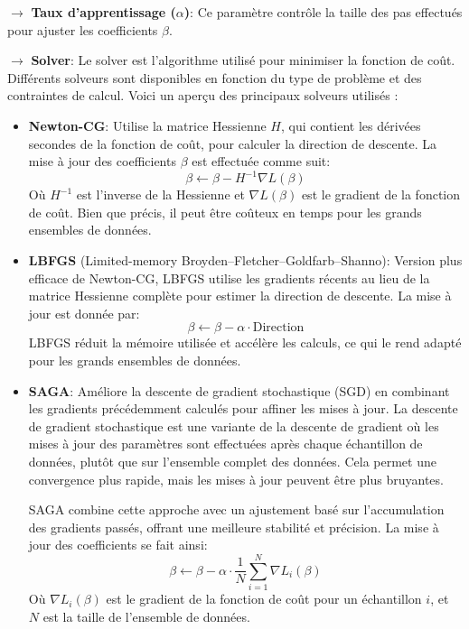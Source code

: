 \noindent \textbf{\(\rightarrow\)} \textbf{Taux d'apprentissage (\( \alpha \))}: Ce paramètre contrôle la taille des pas effectués pour ajuster les coefficients \( \beta \).

\noindent \textbf{\(\rightarrow\)} \textbf{Solver}: Le solver est l'algorithme utilisé pour minimiser la fonction de coût. Différents solveurs sont disponibles en fonction du type de problème et des contraintes de calcul. Voici un aperçu des principaux solveurs utilisés :

\begin{itemize}
    \item \textbf{Newton-CG}: Utilise la matrice Hessienne \( H \), qui contient les dérivées secondes de la fonction de coût, pour calculer la direction de descente. La mise à jour des coefficients \( \beta \) est effectuée comme suit:
    \[
    \beta \leftarrow \beta - H^{-1} \nabla L(\beta)
    \]
    Où \( H^{-1} \) est l'inverse de la Hessienne et \( \nabla L(\beta) \) est le gradient de la fonction de coût. Bien que précis, il peut être coûteux en temps pour les grands ensembles de données.

    \item \textbf{LBFGS} (Limited-memory Broyden–Fletcher–Goldfarb–Shanno): Version plus efficace de Newton-CG, LBFGS utilise les gradients récents au lieu de la matrice Hessienne complète pour estimer la direction de descente. La mise à jour est donnée par:
    \[
    \beta \leftarrow \beta - \alpha \cdot \text{Direction}
    \]
    LBFGS réduit la mémoire utilisée et accélère les calculs, ce qui le rend adapté pour les grands ensembles de données.

    \item \textbf{SAGA}: Améliore la descente de gradient stochastique (SGD) en combinant les gradients précédemment calculés pour affiner les mises à jour. La descente de gradient stochastique est une variante de la descente de gradient où les mises à jour des paramètres sont effectuées après chaque échantillon de données, plutôt que sur l'ensemble complet des données. Cela permet une convergence plus rapide, mais les mises à jour peuvent être plus bruyantes.

    SAGA combine cette approche avec un ajustement basé sur l'accumulation des gradients passés, offrant une meilleure stabilité et précision. La mise à jour des coefficients se fait ainsi:
    \[
    \beta \leftarrow \beta - \alpha \cdot \frac{1}{N} \sum_{i=1}^{N} \nabla L_i(\beta)
    \]
    Où \( \nabla L_i(\beta) \) est le gradient de la fonction de coût pour un échantillon \( i \), et \( N \) est la taille de l'ensemble de données.
\end{itemize}

